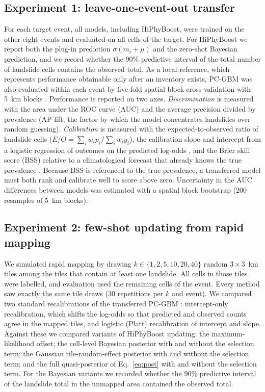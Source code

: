 \subsection{Experiment 1: leave-one-event-out transfer}
For each target event, all models, including HiPhyBoost, were trained on the other eight events and evaluated on all cells of the target. For HiPhyBoost we report both the plug-in prediction $\sigma(m_i+\mu)$ and the zero-shot Bayesian prediction, and we record whether the 90\% predictive interval of the total number of landslide cells contains the observed total. As a local reference, which represents performance obtainable only after an inventory exists, PC-GBM was also evaluated within each event by five-fold spatial block cross-validation with 5~km blocks \citep{roberts2017}. Performance is reported on two axes. \emph{Discrimination} is measured with the area under the ROC curve (AUC) and the average precision divided by prevalence (AP lift, the factor by which the model concentrates landslides over random guessing). \emph{Calibration} is measured with the expected-to-observed ratio of landslide cells ($E/O=\sum_i w_i p_i / \sum_i w_i y_i$), the calibration slope and intercept from a logistic regression of outcomes on the predicted log-odds \citep{steyerberg2004,vancalster2019}, and the Brier skill score (BSS) relative to a climatological forecast that already knows the true prevalence \citep{brier1950}. Because BSS is referenced to the true prevalence, a transferred model must both rank and calibrate well to score above zero. Uncertainty in the AUC differences between models was estimated with a spatial block bootstrap (200 resamples of 5~km blocks).

\subsection{Experiment 2: few-shot updating from rapid mapping}
We simulated rapid mapping by drawing $k\in\{1,2,5,10,20,40\}$ random $3\times3$~km tiles among the tiles that contain at least one landslide. All cells in those tiles were labelled, and evaluation used the remaining cells of the event. Every method saw exactly the same tile draws (30 repetitions per $k$ and event). We compared two standard recalibrations of the transferred PC-GBM \citep{steyerberg2004,janssen2008}: intercept-only recalibration, which shifts the log-odds so that predicted and observed counts agree in the mapped tiles, and logistic (Platt) recalibration of intercept and slope. Against these we compared variants of HiPhyBoost updating: the maximum-likelihood offset; the cell-level Bayesian posterior with and without the selection term; the Gaussian tile-random-effect posterior with and without the selection term; and the full quasi-posterior of Eq.~\eqref{eq:post} with and without the selection term. For the Bayesian variants we recorded whether the 90\% predictive interval of the landslide total in the unmapped area contained the observed total.

